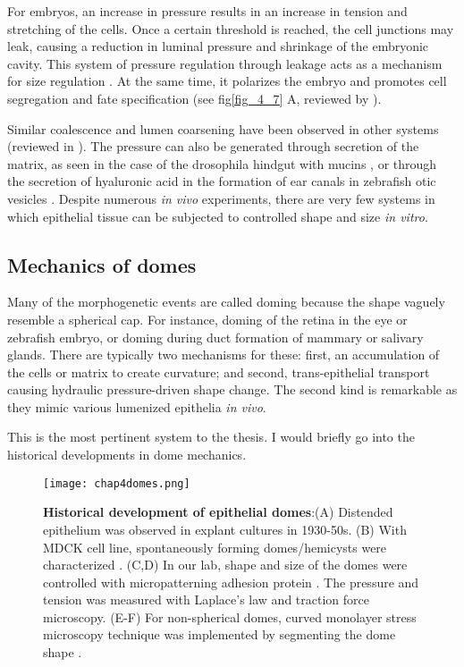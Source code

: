 For embryos, an increase in pressure results in an increase in tension and stretching of the cells. Once a certain threshold is reached, the cell junctions may leak, causing a reduction in luminal pressure and shrinkage of the embryonic cavity. This system of pressure regulation through leakage acts as a mechanism for size regulation \cite{chan2019}. At the same time, it polarizes the embryo and promotes cell segregation and fate specification (see fig\ref{fig_4_7} A, reviewed by \cite{chan2020}).

Similar coalescence and lumen coarsening have been observed in other systems (reviewed in \cite{schliffka2019}). The pressure can also be generated through secretion of the matrix, as seen in the case of the drosophila hindgut with mucins \cite{syed2012}, or through the secretion of hyaluronic acid in the formation of ear canals in zebrafish otic vesicles \cite{munjal2021}. Despite numerous
\textit{in vivo} experiments, there are very few systems in which epithelial tissue can be subjected to controlled shape and size \textit{in vitro}.

\hypertarget{mechanics-of-domes}{%
	\subsection{Mechanics of domes}\label{mechanics-of-domes}}

Many of the morphogenetic events are called doming because the shape vaguely resemble a spherical cap. For instance, doming of the retina in the eye or zebrafish embryo, or doming during duct formation of mammary or salivary glands. There are typically two mechanisms for these: first, an accumulation of the cells or matrix to create curvature; and second, trans-epithelial transport causing hydraulic pressure-driven shape change. The second kind is remarkable as they mimic various lumenized epithelia \textit{in vivo}.

This is the most pertinent system to the thesis. I would briefly go into the historical developments in dome mechanics. 

\begin{figure}
	\centering
	\texttt{[image: chap4domes.png]}
	\caption{\label{fig_4_8} \textbf{Historical development of epithelial domes}:(A) Distended epithelium was observed in explant cultures in 1930-50s. (B) With MDCK cell line, spontaneously forming domes/hemicysts were characterized \cite{leighton1969, valentich1979}. (C,D) In our lab, shape and size of the domes were controlled with micropatterning adhesion protein \cite{latorre2018}. The pressure and tension was measured with Laplace's law and traction force microscopy. (E-F) For non-spherical domes, curved monolayer stress microscopy technique was implemented by segmenting the dome shape \cite{marin-llaurado2022}.
	}
\end{figure}
	
